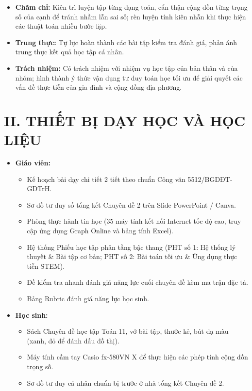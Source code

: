 \documentclass[12pt, a4paper]{article}
\begin{document}
\begin{itemize}[leftmargin=1.2cm]
    \item \textbf{Chăm chỉ:} Kiên trì luyện tập từng dạng toán, cẩn thận cộng dồn từng trọng số của cạnh để tránh nhầm lẫn sai số; rèn luyện tính kiên nhẫn khi thực hiện các thuật toán nhiều bước lặp.
    \item \textbf{Trung thực:} Tự lực hoàn thành các bài tập kiểm tra đánh giá, phản ánh trung thực kết quả học tập cá nhân.
    \item \textbf{Trách nhiệm:} Có trách nhiệm với nhiệm vụ học tập của bản thân và của nhóm; hình thành ý thức vận dụng tư duy toán học tối ưu để giải quyết các vấn đề thực tiễn của gia đình và cộng đồng địa phương.
\end{itemize}

\section*{II. THIẾT BỊ DẠY HỌC VÀ HỌC LIỆU}

\begin{itemize}[leftmargin=1.2cm]
    \item \textbf{Giáo viên:}
    \begin{itemize}[leftmargin=0.6cm]
        \item Kế hoạch bài dạy chi tiết 2 tiết theo chuẩn Công văn 5512/BGDĐT-GDTrH.
        \item Sơ đồ tư duy số tổng kết Chuyên đề 2 trên Slide PowerPoint / Canva.
        \item Phòng thực hành tin học (35 máy tính kết nối Internet tốc độ cao, truy cập ứng dụng Graph Online và bảng tính Excel).
        \item Hệ thống Phiếu học tập phân tầng bậc thang (PHT số 1: Hệ thống lý thuyết \& Bài tập cơ bản; PHT số 2: Bài toán tối ưu \& Ứng dụng thực tiễn STEM).
        \item Đề kiểm tra nhanh đánh giá năng lực cuối chuyên đề kèm ma trận đặc tả.
        \item Bảng Rubric đánh giá năng lực học sinh.
    \end{itemize}

    \item \textbf{Học sinh:}
    \begin{itemize}[leftmargin=0.6cm]
        \item Sách Chuyên đề học tập Toán 11, vở bài tập, thước kẻ, bút dạ màu (xanh, đỏ để đánh dấu đồ thị).
        \item Máy tính cầm tay Casio fx-580VN X để thực hiện các phép tính cộng dồn trọng số.
        \item Sơ đồ tư duy cá nhân chuẩn bị trước ở nhà tổng kết Chuyên đề 2.
    \end{itemize}
\end{itemize}
\end{document}
